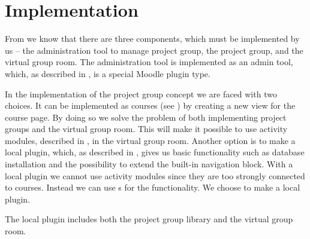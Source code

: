 \chapter{Implementation}
\label{chap:implementation}
From  we know that there are three components, which must be implemented by us -- the administration tool to manage project group, the project group, and the virtual group room. 
The administration tool is implemented as an admin tool, which, as described in , is a special Moodle plugin type. 

In the implementation of the project group concept we are faced with two choices. 
It can be implemented as courses (see ) by creating a new view for the course page. 
By doing so we solve the problem of both implementing project groups and the virtual group room.
This will make it possible to use activity modules, described in , in the virtual group room.
Another option is to make a local plugin, which, as described in , gives us basic functionality such as database installation and the possibility to extend the built-in navigation block. 
With a local plugin we cannot use activity modules since they are too strongly connected to courses. 
Instead we can use \block{}s for the functionality. 
We choose to make a local plugin.

The local plugin includes both the project group library and the virtual group room.


